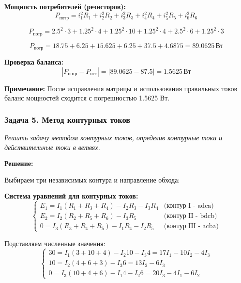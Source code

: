 \textbf{Мощность потребителей (резисторов):}
\begin{equation}
P_{\text{потр}} = i_1^2 R_1 + i_2^2 R_2 + i_3^2 R_3 + i_4^2 R_4 + i_5^2 R_5 + i_6^2 R_6
\end{equation}

\begin{equation}
P_{\text{потр}} = 2.5^2 \cdot 3 + 1.25^2 \cdot 4 + 1.25^2 \cdot 10 + 1.25^2 \cdot 4 + 2.5^2 \cdot 6 + 1.25^2 \cdot 3
\end{equation}

\begin{equation}
P_{\text{потр}} = 18.75 + 6.25 + 15.625 + 6.25 + 37.5 + 4.6875 = 89.0625\,\text{Вт}
\end{equation}

\textbf{Проверка баланса:}
\begin{equation}
|P_{\text{потр}} - P_{\text{ист}}| = |89.0625 - 87.5| = 1.5625\,\text{Вт}
\end{equation}

\textbf{Примечание:} После исправления матрицы и использования правильных токов баланс мощностей сходится с погрешностью 1.5625 Вт.




\subsubsection{Задача 5. Метод контурных токов}
\textit{Решить задачу методом контурных токов, определив контурные токи и действительные токи в ветвях.}

\textbf{Решение:}

Выбираем три независимых контура и направление обхода:

\textbf{Система уравнений для контурных токов:}
$$\begin{cases}
E_1 = I_1 (R_1 + R_3 + R_4) - I_2R_3 - I_3R_4 & \text{(контур I - adca)} \\
E_2 = I_2 (R_2 + R_5 + R_6) - I_3R_5 & \text{(контур II - bdcb)} \\
0 = I_3 (R_3 + R_4 + R_5) - I_1R_4 - I_2R_5 & \text{(контур III - acba)}
\end{cases}$$

Подставляем численные значения:
$$\begin{cases}
30 = I_1 (3 + 10 + 4) - I_2 10 - I_3 4 = 17I_1 - 10I_2 - 4I_3 \\
10 = I_2 (4 + 6 + 3) - I_3 6 = 13I_2 - 6I_3 \\
0 = I_3 (10 + 4 + 6) - I_1 4 - I_2 6 = 20I_3 - 4I_1 - 6I_2
\end{cases}$$

